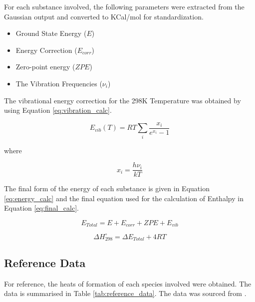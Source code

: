 For each substance involved, the following parameters were extracted from the Gaussian output and converted to KCal/mol for standardization.

\begin{itemize}
    \item Ground State Energy ($E$)
    \item Energy Correction ($E_{corr}$)
    \item Zero-point energy ($ZPE$)
    \item The Vibration Frequencies ($\nu_i$)
\end{itemize}

The vibrational energy correction for the 298K Temperature was obtained by using Equation \ref{eq:vibration_calc}.

\begin{equation} \label{eq:vibration_calc}
    E_{vib}(T) = RT \sum_i \frac{x_i}{e^{x_i} - 1}
\end{equation}

where

\begin{equation}
    x_i = \frac{h \nu_i}{kT}
\end{equation}

The final form of the energy of each substance is given in Equation \ref{eq:energy_calc} and the final equation used for the calculation of Enthalpy in Equation \ref{eq:final_calc}.

\begin{equation} \label{eq:energy_calc}
    E_{Total} = E + E_{corr} + ZPE + E_{vib}
\end{equation}

\begin{equation} \label{eq:final_calc}
    \Delta H^{\circ}_{298} = \Delta E_{Total} + 4RT
\end{equation}

\subsection{Reference Data}

For reference, the heats of formation of each species involved were obtained. The data is summarised in Table \ref{tab:reference_data}. The data was sourced from \cite{linstrom_nist_1997, pittam_measurements_1972, chang_vacuum_2017, roux_critically_2008, manion_evaluated_2002}. 

